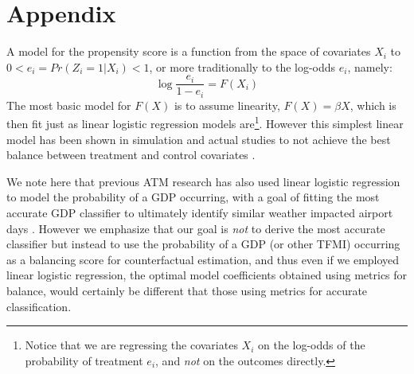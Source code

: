 \documentclass[conference]{IEEEtran}
\begin{document}
%
%

\section{Appendix}
A model for the propensity score is a function from the space of covariates $X_i$ to $0<e_i=Pr(Z_i=1|X_i)<1$, or more traditionally to the log-odds $e_i$, namely:  
\begin{equation}
\log\frac{e_i}{1-e_i}=F(X_i)
\end{equation}
The most basic model for $F(X)$ is to assume linearity, $F(X)=\beta X$, which is then fit just as linear logistic regression models are\footnote{Notice that we are regressing the covariates $X_i$ on the log-odds of the probability of treatment $e_i$, and \emph{not} on the outcomes directly.}. However this simplest linear model has been shown in simulation and actual studies to not achieve the best balance between treatment and control covariates .  

We note here that previous ATM research has also used linear logistic regression to model the probability of a GDP occurring, with a goal of fitting the most accurate GDP classifier to ultimately identify similar weather impacted airport days \cite{Grabbe:2014aa}.  However we emphasize that our goal is \emph{not} to derive the most accurate classifier but instead to use the probability of a GDP (or other TFMI) occurring as a balancing score for counterfactual estimation, and thus even if we employed linear logistic regression, the optimal model coefficients obtained using metrics for balance, would certainly be different that those using metrics for accurate classification.
\end{document}
